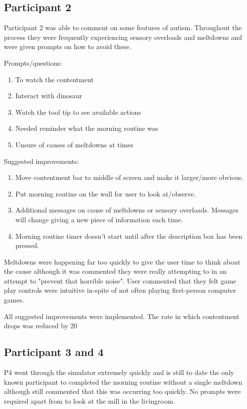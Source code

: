 \documentclass[11pt]{report}
\begin{document}
\subsection*{Participant 2} 
Participant 2 was able to comment on some features of autism. Throughout the process they were frequently experiencing sensory overloads and meltdowns and were given prompts on how to avoid these.

Prompts/questions:
\begin{enumerate}
\item To watch the contentment
\item Interact with dinosaur
\item Watch the tool tip to see available actions
\item Needed reminder what the morning routine was
\item Unsure of causes of meltdowns at times
\end{enumerate}

Suggested improvements:
\begin{enumerate}
\item Move contentment bar to middle of screen and make it larger/more obvious. 
\item Put morning routine on the wall for user to look at/observe. 
\item Additional messages on cause of meltdowns or sensory overloads. Messages will change giving a new piece of information each time.
\item Morning routine timer doesn't start until after the description box has been pressed. 
\end{enumerate}

Meltdowns were happening far too quickly to give the user time to think about the cause although it was commented they were really attempting to in an attempt to "prevent that horrible noise". User commented that they felt game play controls were intuitive in-spite of not often playing first-person computer games. 

All suggested improvements were implemented. The rate in which contentment drops was reduced by 20%

\subsection*{Participant 3 and 4}
P4 went through the simulator extremely quickly and is still to date the only known participant to completed the morning routine without a single meltdown although still commented that this was occurring too quickly. No prompts were required apart from to look at the mill in the livingroom. 
\end{document}
